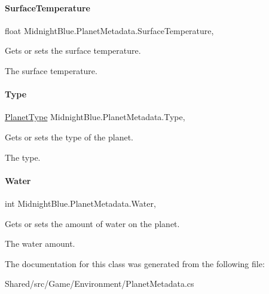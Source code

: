 \paragraph{\texorpdfstring{Surface\+Temperature}{SurfaceTemperature}}
{\footnotesize\ttfamily float Midnight\+Blue.\+Planet\+Metadata.\+Surface\+Temperature\hspace{0.3cm}{\ttfamily [get]}, {\ttfamily [set]}}



Gets or sets the surface temperature. 

The surface temperature.\hypertarget{class_midnight_blue_1_1_planet_metadata_a9d8ec38e5924a68970df4795c6185971}{}\label{class_midnight_blue_1_1_planet_metadata_a9d8ec38e5924a68970df4795c6185971} 
\paragraph{\texorpdfstring{Type}{Type}}
{\footnotesize\ttfamily \hyperlink{namespace_midnight_blue_a4a799009a18b57979628708589ae53e3}{Planet\+Type} Midnight\+Blue.\+Planet\+Metadata.\+Type\hspace{0.3cm}{\ttfamily [get]}, {\ttfamily [set]}}



Gets or sets the type of the planet. 

The type.\hypertarget{class_midnight_blue_1_1_planet_metadata_a0b1319aa47d656c56cbcda678a938235}{}\label{class_midnight_blue_1_1_planet_metadata_a0b1319aa47d656c56cbcda678a938235} 
\paragraph{\texorpdfstring{Water}{Water}}
{\footnotesize\ttfamily int Midnight\+Blue.\+Planet\+Metadata.\+Water\hspace{0.3cm}{\ttfamily [get]}, {\ttfamily [set]}}



Gets or sets the amount of water on the planet. 

The water amount.

The documentation for this class was generated from the following file\+:\begin{DoxyCompactItemize}
\item 
Shared/src/\+Game/\+Environment/Planet\+Metadata.\+cs\end{DoxyCompactItemize}
